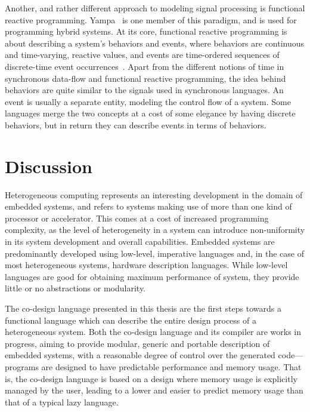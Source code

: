 \documentclass[../paper.tex]{subfiles}
\begin{document}
Another, and rather different approach to modeling signal processing is functional reactive programming. Yampa~\cite{yampa2003} is one member of this paradigm, and is used for programming hybrid systems. At its core, functional reactive programming is about describing a system's behaviors and events, where behaviors are continuous and time-varying, reactive values, and events are time-ordered sequences of discrete-time event occurrences~\cite{nilsson2002}. Apart from the different notions of time in synchronous data-flow and functional reactive programming, the idea behind behaviors are quite similar to the signals used in synchronous languages. An event is usually a separate entity, modeling the control flow of a system. Some languages merge the two concepts at a cost of some elegance by having discrete behaviors, but in return they can describe events in terms of behaviors.

\section{Discussion}
\label{disc}

Heterogeneous computing represents an interesting development in the domain of embedded systems, and refers to systems making use of more than one kind of processor or accelerator. This comes at a cost of increased programming complexity, as the level of heterogeneity in a system can introduce non-uniformity in its system development and overall capabilities. Embedded systems are predominantly developed using low-level, imperative languages and, in the case of most heterogeneous systems, hardware description languages. While low-level languages are good for obtaining maximum performance of system, they provide little or no abstractions or modularity. 

The co-design language presented in this thesis are the first steps towards a functional language which can describe the entire design process of a heterogeneous system. Both the co-design language and its compiler are works in progress, aiming to provide modular, generic and portable description of embedded systems, with a reasonable degree of control over the generated code---programs are designed to have predictable performance and memory usage. That is, the co-design language is based on a design where memory usage is explicitly managed by the user, leading to a lower and easier to predict memory usage than that of a typical lazy language.
\end{document}
